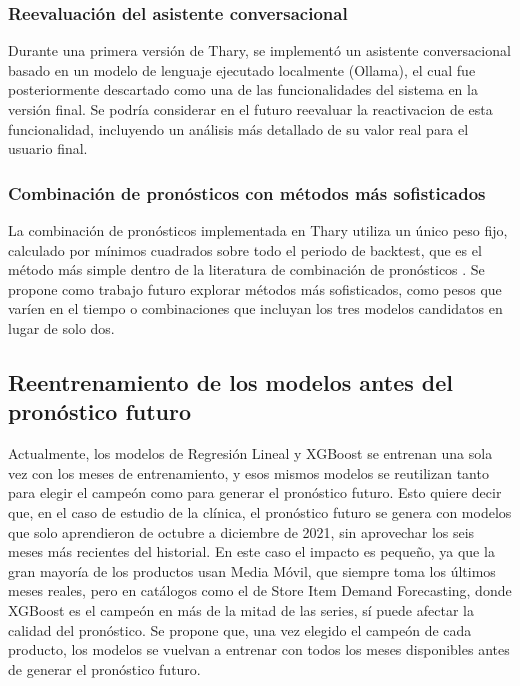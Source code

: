 \subsubsection{Reevaluación del asistente conversacional}

Durante una primera versión de Thary, se implementó un asistente conversacional basado en un modelo de lenguaje ejecutado localmente (Ollama), el cual fue posteriormente descartado como una de las funcionalidades del sistema en la versión final. Se podría considerar en el futuro reevaluar la reactivacion de esta funcionalidad, incluyendo un análisis más detallado de su valor real para el usuario final.

\subsubsection{Combinación de pronósticos con métodos más sofisticados}

La combinación de pronósticos implementada en Thary utiliza un único peso fijo, calculado por mínimos cuadrados sobre todo el periodo de backtest, que es el método más simple dentro de la literatura de combinación de pronósticos \cite{wang2023combinations}. Se propone como trabajo futuro explorar métodos más sofisticados, como pesos que varíen en el tiempo o combinaciones que incluyan los tres modelos candidatos en lugar de solo dos.

\subsection{Reentrenamiento de los modelos antes del pronóstico futuro}

Actualmente, los modelos de Regresión Lineal y XGBoost se entrenan una sola vez con los meses de entrenamiento, y esos mismos modelos se reutilizan tanto para elegir el campeón como para generar el pronóstico futuro. Esto quiere decir que, en el caso de estudio de la clínica, el pronóstico futuro se genera con modelos que solo aprendieron de octubre a diciembre de 2021, sin aprovechar los seis meses más recientes del historial. En este caso el impacto es pequeño, ya que la gran mayoría de los productos usan Media Móvil, que siempre toma los últimos meses reales, pero en catálogos como el de Store Item Demand Forecasting, donde XGBoost es el campeón en más de la mitad de las series, sí puede afectar la calidad del pronóstico. Se propone que, una vez elegido el campeón de cada producto, los modelos se vuelvan a entrenar con todos los meses disponibles antes de generar el pronóstico futuro.